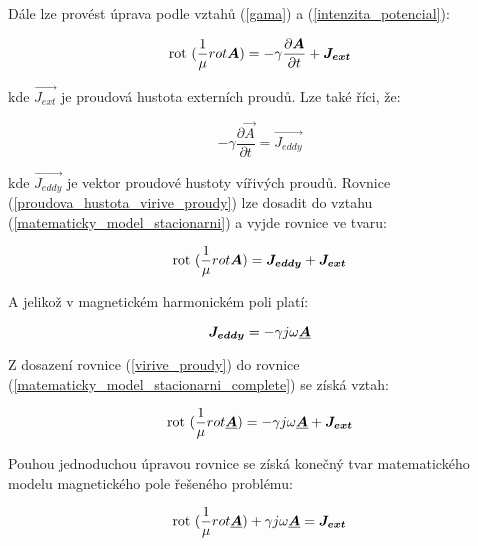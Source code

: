 Dále lze provést úprava podle vztahů (\ref{gama}) a (\ref{intenzita_potencial}):

\begin{equation}
	\mathrm{rot}\  (\frac{1}{\mu} {rot \mbox{\boldmath$A$}}) = - \gamma \frac{\partial \mbox{\boldmath$A$}}{\partial t} + \mbox{\boldmath$J_{ext}$}
	\label{matematicky_model_stacionarni}
\end{equation}

kde $\vec{J_{ext}}$ je proudová hustota externích proudů. Lze také říci, že:

\begin{equation}
	- \gamma \frac{\partial \vec{A}}{\partial t} = \vec{J_{eddy}}
	\label{proudova_hustota_virive_proudy}
\end{equation}

kde $\vec{J_{eddy}}$ je vektor proudové hustoty vířivých proudů. Rovnice (\ref{proudova_hustota_virive_proudy}) lze dosadit do vztahu (\ref{matematicky_model_stacionarni}) a vyjde rovnice ve tvaru:

\begin{equation}
	\mathrm{rot}\  (\frac{1}{\mu} {rot \mbox{\boldmath$A$}}) = \mbox{\boldmath$J_{eddy}$} + \mbox{\boldmath$J_{ext}$}
	\label{matematicky_model_stacionarni_complete}
\end{equation}

A jelikož v magnetickém harmonickém poli platí:

\begin{equation}
	\mbox{\boldmath$J_{eddy}$} = - \gamma j \omega \mbox{\underline{\boldmath$A$}}
	\label{virive_proudy}
\end{equation}

Z dosazení rovnice (\ref{virive_proudy}) do rovnice (\ref{matematicky_model_stacionarni_complete}) se získá vztah:

\begin{equation}
	\mathrm{rot}\  (\frac{1}{\mu} {rot \mbox{\underline{\boldmath$A$}}}) = - \gamma j \omega \mbox{\underline{\boldmath$A$}} + \mbox{\boldmath$J_{ext}$}
\end{equation}

Pouhou jednoduchou úpravou rovnice se získá konečný tvar matematického modelu magnetického pole řešeného problému:

\begin{equation}
	\mathrm{rot}\  (\frac{1}{\mu} {rot \mbox{\underline{\boldmath$A$}}}) + \gamma j \omega \mbox{\underline{\boldmath$A$}} = \mbox{\boldmath$J_{ext}$}
	\label{matematicky_model_magneticke_pole}
\end{equation}